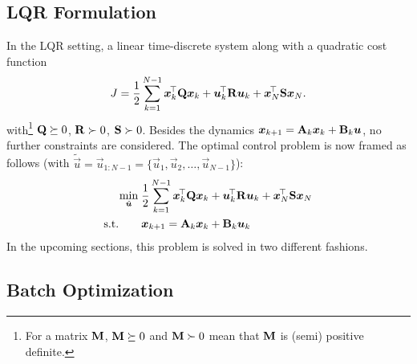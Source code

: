 		\subsection{LQR Formulation}
			In the LQR setting, a linear time-discrete system along with a quadratic cost function
			\begin{equation}
				J = \frac{1}{2} \sum_{k = 1}^{N - 1} \bm{x}_k^{\!\top} \bm{\mathrm{Q}} \bm{x}_k + \bm{u}_k^{\!\top} \bm{\mathrm{R}} \bm{u}_k + \bm{x}_N^{\!\top} \bm{\mathrm{S}} \bm{x}_N.  \label{eqn:lqrCost}
			\end{equation}
			with\footnote{For a matrix \(\bm{\mathrm{M}}\), \( \bm{\mathrm{M}} \succeq 0\) and \( \bm{\mathrm{M}} \succ 0 \) mean that \(\bm{\mathrm{M}}\) is (semi) positive definite.} \( \bm{\mathrm{Q}} \succeq 0 \), \( \bm{\mathrm{R}} \succ 0 \), \( \bm{\mathrm{S}} \succ 0 \). Besides the dynamics \( \bm{x}_{k + 1} = \bm{\mathrm{A}}_k \bm{x}_k + \bm{\mathrm{B}}_k \bm{u} \), no further constraints are considered. The optimal control problem is now framed as follows (with \( \tilde{\vec{u}} = \vec{u}_{1:N - 1} = \{ \vec{u}_1, \vec{u}_2, \dots, \vec{u}_{N - 1} \} \)):
			\begin{align}
				\min_{\tilde{\bm{u}}}\; & \frac{1}{2} \sum_{k = 1}^{N - 1} \bm{x}_k^{\!\top} \bm{\mathrm{Q}} \bm{x}_k + \bm{u}_k^{\!\top} \bm{\mathrm{R}} \bm{u}_k + \bm{x}_N^{\!\top} \bm{\mathrm{S}} \bm{x}_N \\
				\text{s.t.}\qquad&
					\begin{aligned}
						\bm{x}_{k + 1} &= \bm{\mathrm{A}}_k \bm{x}_k + \bm{\mathrm{B}}_k \bm{u}_k
					\end{aligned}
				\label{eqn:lqr}
			\end{align}
			In the upcoming sections, this problem is solved in two different fashions.

		\subsection{Batch Optimization}
			\label{subsec:batchOpt}

